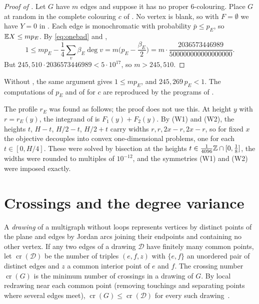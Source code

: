 \documentclass[11pt,colorlinks]{charlie}
\newcommand{\cro}{\operatorname{cr}}
\begin{document}
\begin{proof}[Proof of ]
Let $G$ have $m$ edges and suppose it has no proper $6$-colouring. Place $G$ at random in the complete colouring $c$ of . No vertex is blank, so with $F=\emptyset$ we have $Y=0$ in . Each edge is monochromatic with probability $\bar p\le p_E$, so $\mathbb{E} X\le mp_E$. By \eqref{eq:onebad} and ,
\[
 1\le mp_E-\frac14\sum_v\beta_E\deg v=m\Big(p_E-\frac{\beta_E}2\Big)=m\cdot\frac{2036573446989}{500000000000000000}.
\]
But $245{,}510\cdot2036573446989<5\cdot10^{17}$, so $m>245{,}510$.
\end{proof}

Without , the same argument gives $1\le mp_E$, and $245{,}269\,p_E<1$. The computations of $p_E$ and of  for $c$ are reproduced by the programs of .

\begin{remark}
The profile $r_E$ was found as follows; the proof does not use this. At height $y$ with $r=r_E(y)$, the integrand of  is $F_1(y)+F_2(y)$. By (W1) and (W2), the heights $t$, $H-t$, $H/2-t$, $H/2+t$ carry widths $r,r,2x-r,2x-r$, so for fixed $x$ the objective decouples into convex one-dimensional problems, one for each $t\in[0,H/4]$. These were solved by bisection at the heights $t\in\frac{1}{4096}\mathbb{Z}\cap[0,\tfrac18]$, the widths were rounded to multiples of $10^{-12}$, and the symmetries (W1) and (W2) were imposed exactly.
\end{remark}

\section{Crossings and the degree variance}\label{sec:crossing}

A \emph{drawing} of a multigraph without loops represents vertices by distinct points of the plane and edges by Jordan arcs joining their endpoints and containing no other vertex. If any two edges of a drawing $\mathcal D$ have finitely many common points, let $\cro(\mathcal D)$ be the number of triples $(e,f,z)$ with $\{e,f\}$ an unordered pair of distinct edges and $z$ a common interior point of $e$ and $f$. The crossing number $\cro(G)$ is the minimum number of crossings in a drawing of $G$. By local redrawing near each common point (removing touchings and separating points where several edges meet), $\cro(G)\le\cro(\mathcal D)$ for every such drawing~\cite{Schaefer}.
\end{document}

